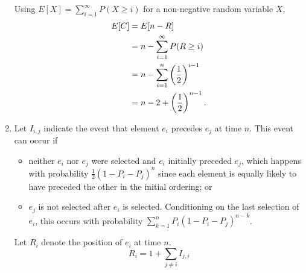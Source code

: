 \documentclass{article}
\begin{document}
\begin{enumerate}
    Using $E[X] = \sum_{i=1}^\infty P(X \geq i)$ for a non-negative random variable $X$,
    \[\begin{split}
    E[C]    & = E[n-R] \\
            & = n - \sum_{i=1}^\infty P(R \geq i) \\
            & = n - \sum_{i=1}^n \left(\frac{1}{2}\right)^{i-1} \\
            & = n - 2 + \left(\frac{1}{2}\right)^{n-1} \text.
    \end{split}\]
\item
    Let $I_{i,j}$ indicate the event that element $e_i$ precedes $e_j$ at time $n$.
    This event can occur if
    \begin{itemize}
    \item neither $e_i$ nor $e_j$ were selected and $e_i$ initially preceded $e_j$,
    which happens with probability $\frac{1}{2}\left(1-P_i-P_j\right)^n$ since each element is equally likely
    to have preceded the other in the initial ordering; or
    \item $e_j$ is not selected after $e_i$ is selected. Conditioning on the last selection of $e_i$, this occurs
    with probability $\sum_{k=1}^n P_i\left(1-P_i-P_j\right)^{n-k}$.
    \end{itemize}

    Let $R_i$ denote the position of $e_i$ at time $n$.
    \[ R_i = 1 + \sum_{j\neq i}I_{j,i} \]


\end{enumerate}
\end{document}
